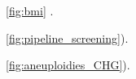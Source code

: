 \documentclass[
11pt, %
oneside, %
english, %
singlespacing, %
headsepline, %
]{MastersDoctoralThesisV2} %
\begin{document}

\tableofcontents %













\newline

 \ref{fig:bmi} .\newline

 \ref{fig:pipeline_screening}).\newline

 \ref{fig:aneuploidies_CHG}).\newline




\printglossary
\begin{acknowledgements}
\addchaptertocentry{\acknowledgementname}
\end{acknowledgements}
\end{document}
